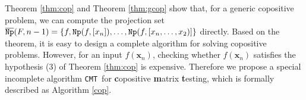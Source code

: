 \documentclass[amsthm]{elsart}
\def  \Nproj {{\tt Np}}
\newcommand{\xx}{\bm{x}}
\def \TCPT {{\tt CMT}}
\begin{document}
\begin{comment}
\begin{rem}
If the coefficients $a_{i,j}$ of $f(\xx_{n})$ in Theorem \ref{thm:cop} are pairwise different real parameters except that $a_{i,j}=a_{j,i}$, hypotheses (1) and (2) of Theorem \ref{thm:cop} hold. However, it is difficult for us to prove that hypotheses (3) and (4) also hold. Nevertheless, we guess they are satisfied. So, we conjecture the following results:
\begin{enumerate}
\item   Suppose $f(\xx_n)$ is a quadratic polynomial in the form of (\ref{eq:f})  where $a_{i,j}$ are pairwise different real parameters except that $a_{i,j}=a_{j,i} (1\le i,j\le n+1)$. Let $A_{n}=(a_{i,j})_{i,j=1}^{n}$, $A_{n+1}=(a_{i,j})_{i,j=1}^{n+1}$ and $F(\xx_n)=f(x_1^2,\ldots,x_n^2)$. Then $\Nproj(F,[\xx_n])=\det(A_{n})\det(A_{n+1})$.
\item   Suppose $g(\xx_{n})=\sum_{1\le i,j\le n} a_{i,j}x_ix_j=\xx_{n}A_{n}\xx_{n}^T$ is a quadratic polynomial
        where $a_{i,j}$ are pairwise different real parameters except that $a_{i,j}=a_{j,i} (1\le i,j\le n)$. Let $A_{n}=(a_{i,j})_{i,j=1}^{n}$ and $G(\xx_n)=g(x_1^2,\ldots,x_n^2)$. Then $\Nproj(G,[\xx_n])=\det(A_{n})$.
\end{enumerate}
\end{rem}
\end{comment}
Theorem \ref{thm:cop} and Theorem \ref{thm:gcop} show that, for a generic copositive problem, we can compute the projection set $\overline{\Nproj}(F,{n-1})=\{f,\Nproj(f,[x_{n}]), \ldots, \Nproj(f,[x_{n},\ldots,x_2)]\}$ directly. Based on the theorem, it is easy to design a complete algorithm for solving copositive problems. However, for an input $f(\xx_n)$, checking whether $f(\xx_n)$ satisfies the hypothesis (3) of Theorem \ref{thm:cop} is expensive. Therefore we propose a special incomplete algorithm \TCPT\ for {\bf c}opositive {\bf m}atrix {\bf t}esting, which is formally described as Algorithm \ref{cop}.
\end{document}
